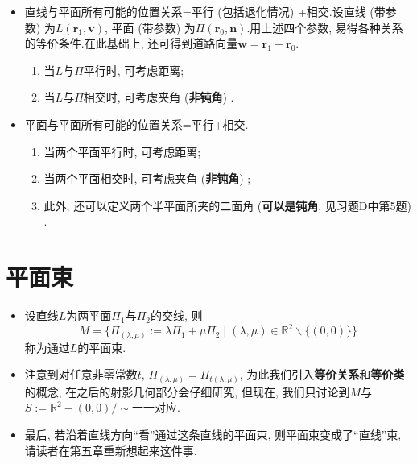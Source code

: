 \documentclass[./main.tex]{subfiles}
\begin{document}
\begin{itemize}
\begin{enumerate}
\begin{enumerate}
        \end{enumerate}
    \end{enumerate}
    \item 直线与平面所有可能的位置关系=平行 (包括退化情况) +相交.设直线 (带参数) 为$L(\mathbf{r}_1,\mathbf{v})$, 平面 (带参数) 为$\Pi(\mathbf{r}_0,\mathbf{n}).$用上述四个参数, 易得各种关系的等价条件.在此基础上, 还可得到道路向量$\mathbf{w}=\mathbf{r}_1-\mathbf{r}_0$.
    \begin{enumerate}
        \item 当$L$与$\Pi$平行时, 可考虑距离; 
        \item 当$L$与$\Pi$相交时, 可考虑夹角 (\textbf{非钝角}) .
    \end{enumerate}
\item 平面与平面所有可能的位置关系=平行+相交.
\begin{enumerate}
    \item 当两个平面平行时, 可考虑距离; 
    \item 当两个平面相交时, 可考虑夹角 (\textbf{非钝角}) ; 
    \item 此外, 还可以定义两个半平面所夹的二面角 (\textbf{可以是钝角}, 见习题D中第5题) .
\end{enumerate}
\end{itemize}

\section{平面束}
\begin{itemize}
    \item 设直线$L$为两平面$\Pi_1$与$\Pi_2$的交线, 则$$M=\{\Pi_{(\lambda,\mu)}:=\lambda \Pi_1+\mu \Pi_2 \mid (\lambda,\mu)\in \mathbb{R}^2\backslash \{(0,0)\}\}$$称为通过$L$的平面束.
    \item 注意到对任意非零常数$t$, $\Pi_{(\lambda,\mu)}=\Pi_{t(\lambda,\mu)}$, 为此我们引入\textbf{等价关系}和\textbf{等价类}的概念, 在之后的射影几何部分会仔细研究, 但现在, 我们只讨论到$M$与$S:=\mathbb{R}^2-(0,0)/\sim$一一对应.
    \item 最后, 若沿着直线方向``看''通过这条直线的平面束, 则平面束变成了``直线''束, 请读者在第五章重新想起来这件事.
\end{itemize}
\end{document}
